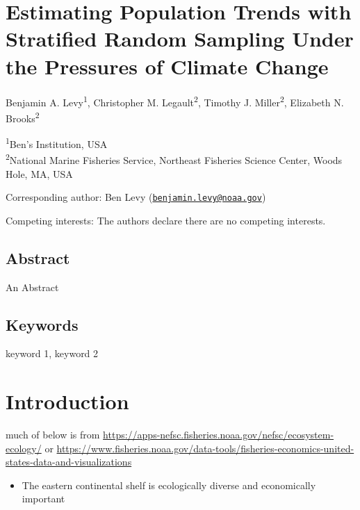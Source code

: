 \documentclass[
]{article}
\author{}
\date{\vspace{-2.5em}}
\providecommand{\tightlist}{%
  \setlength{\itemsep}{0pt}\setlength{\parskip}{0pt}}
\begin{document}
\newpage

\hypertarget{estimating-population-trends-with-stratified-random-sampling-under-the-pressures-of-climate-change}{%
\section{Estimating Population Trends with Stratified Random Sampling Under the Pressures of Climate Change}\label{estimating-population-trends-with-stratified-random-sampling-under-the-pressures-of-climate-change}}

Benjamin A. Levy\textsuperscript{1}, Christopher M. Legault\textsuperscript{2}, Timothy J. Miller\textsuperscript{2}, Elizabeth N. Brooks\textsuperscript{2}

\textsuperscript{1}Ben's Institution, USA\\
\textsuperscript{2}National Marine Fisheries Service, Northeast Fisheries Science Center, Woods Hole, MA, USA

Corresponding author: Ben Levy (\href{mailto:benjamin.levy@noaa.gov}{\nolinkurl{benjamin.levy@noaa.gov}})

Competing interests: The authors declare there are no competing interests.

\newpage

\hypertarget{abstract}{%
\subsection{Abstract}\label{abstract}}

An Abstract

\hypertarget{keywords}{%
\subsection{Keywords}\label{keywords}}

keyword 1, keyword 2

\newpage

\section{Introduction}

much of below is from \url{https://apps-nefsc.fisheries.noaa.gov/nefsc/ecosystem-ecology/}
or
\url{https://www.fisheries.noaa.gov/data-tools/fisheries-economics-united-states-data-and-visualizations}

\begin{itemize}
\tightlist
\item
  The eastern continental shelf is ecologically diverse and economically important
\end{itemize}
\end{document}
